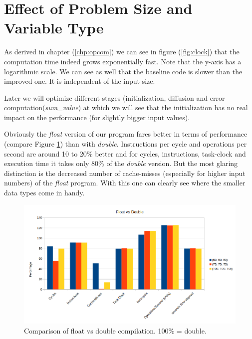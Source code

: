 \documentclass[12pt,a4paper]{article}
\begin{document}
\section{Effect of Problem Size and Variable Type}

As derived in chapter (\ref{chp:opcom}) we can see in figure (\ref{fig:clock}) that the computation time indeed grows exponentially fast. Note that the y-axis has a logarithmic scale. We can see as well that the baseline code is slower than the improved one. It is independent of the input size.

Later we will optimize different stages (initialization, diffusion and error computation(\emph{sum\_value}) at which we will see that the initialization has no real impact on the performance (for slightly bigger input values). 

Obviously the \emph{float} version of our program fares better in terms of performance (compare Figure \ref{fig:floatvsdouble}) than with \emph{double}. Instructions per cycle and operations per second are around 10 to 20\% better and for cycles, instructions, task-clock and execution time it takes only 80\% of the \emph{double} version. But the most glaring distinction is the decreased number of cache-misses (especially for higher input numbers) of the \emph{float} program. With this one can clearly see where the smaller data types come in handy. 
\begin{figure}[h]
	\centering
	\includegraphics[width=1.0\linewidth]{"Benchmark 3/floatvsdouble"}
	\caption{Comparison of float vs double compilation. 100\% = double. }
	\label{fig:floatvsdouble}
\end{figure}
\end{document}
